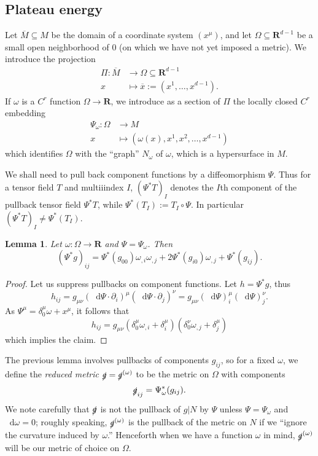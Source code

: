 \documentclass[reqno,12pt,letterpaper]{amsart}
\newcommand{\RR}{\mathbf{R}}
\newcommand*\dif{\mathop{}\!\mathrm{d}}
\newcommand{\dfn}[1]{\emph{#1}\index{#1}}
\newtheorem{lemma}[theorem]{Lemma}
\theoremstyle{definition}
\numberwithin{equation}{section}
\begin{document}
\subsection{Plateau energy}
Let $\overline M \subseteq M$ be the domain of a coordinate system $(x^\mu)$, and let $\Omega \subseteq \RR^{d - 1}$ be a small open neighborhood of $0$ (on which we have not yet imposed a metric).
We introduce the projection
\begin{align*}
    \Pi: \overline M &\to \Omega \subseteq \RR^{d - 1}\\
    x &\mapsto \overline x := (x^1, \dots, x^{d - 1}).
\end{align*}
If $\omega$ is a $C^r$ function $\Omega \to \RR$, we introduce as a section of $\Pi$ the locally closed $C^r$ embedding
\begin{align*}
    \Psi_\omega: \Omega &\to M \\
    x &\mapsto (\omega(x), x^1, x^2, \dots, x^{d - 1})
\end{align*}
which identifies $\Omega$ with the ``graph'' $N_\omega$ of $\omega$, which is a hypersurface in $M$.

We shall need to pull back component functions by a diffeomorphism $\Psi$. Thus for a tensor field $T$ and multiiindex $I$,
$(\Psi^* T)_I$ denotes the $I$th component of the pullback tensor field $\Psi^* T$, while $\Psi^* (T_I) := T_I \circ \Psi$.
In particular $(\Psi^* T)_I \neq \Psi^* (T_I)$.

\begin{lemma}\label{pullback metric to Omega}
Let $\omega: \Omega \to \RR$ and $\Psi = \Psi_\omega$. Then
$$(\Psi^* g)_{ij} = \Psi^* (g_{00}) \omega_{,i} \omega_{,j} + 2 \Psi^* (g_{i0}) \omega_{,j} + \Psi^* (g_{ij}).$$
\end{lemma}
\begin{proof}
Let us suppress pullbacks on component functions. Let $h = \Psi^* g$, thus
$$h_{ij} = g_{\mu\nu} (\dif \Psi \cdot \partial_i)^\mu (\dif \Psi \cdot \partial_j)^\nu = g_{\mu\nu} (\dif \Psi)^\mu_i (\dif \Psi)^\nu_j.$$
As $\Psi^\mu = \delta^\mu_0 \omega + x^\mu$,
it follows that
$$h_{ij} = g_{\mu\nu}(\delta^\mu_0 \omega_{,i} + \delta^\mu_i)(\delta^\nu_0 \omega_{,j} + \delta^\mu_j)$$
which implies the claim.
\end{proof}

The previous lemma involves pullbacks of components $g_{ij}$, so for a fixed $\omega$, we define the \dfn{reduced metric} $\slashed g = \slashed g^{(\omega)}$ to be the metric on $\Omega$ with components
$$\slashed g_{ij} = \Psi_\omega^*(g_{ij}).$$
We note carefully that $\slashed g$ is not the pullback of $g|N$ by $\Psi$ unless $\Psi = \Psi_\omega$ and $\dif \omega = 0$; roughly speaking, $\slashed g^{(\omega)}$ is the pullback of the metric on $N$ if we ``ignore the curvature induced by $\omega$.''
Henceforth when we have a function $\omega$ in mind, $\slashed g^{(\omega)}$ will be our metric of choice on $\Omega$.
\end{document}
